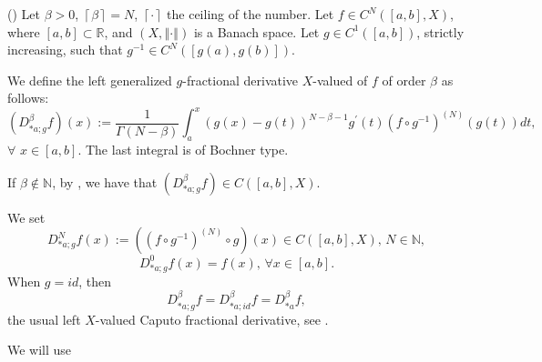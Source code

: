 \documentclass[10pt]{NSP1}
\numberwithin{equation}{section}
\begin{document}
\begin{definition}
\label{d4}(\cite{5}) Let $\beta >0$, $\left \lceil \beta \right \rceil =N$, $%
\left \lceil \cdot \right \rceil $ the ceiling of the number. Let $f\in
C^{N}\left( \left[ a,b\right] ,X\right) $, where $\left[ a,b\right] \subset
\mathbb{R}$, and $\left( X,\left \Vert \cdot \right \Vert \right) $ is a
Banach space. Let $g\in C^{1}\left( \left[ a,b\right] \right) $, strictly
increasing, such that $g^{-1}\in C^{N}\left( \left[ g\left( a\right)
,g\left( b\right) \right] \right) .$

We define the left generalized $g$-fractional derivative $X$-valued of $f$
of order $\beta $ as follows:
\begin{equation}
\left( D_{\ast a;g}^{\beta }f\right) \left( x\right) :=\frac{1}{\Gamma
\left( N-\beta \right) }\int_{a}^{x}\left( g\left( x\right) -g\left(
t\right) \right) ^{N-\beta -1}g^{\prime }\left( t\right) \left( f\circ
g^{-1}\right) ^{\left( N\right) }\left( g\left( t\right) \right) dt,
\tag{15}  \label{15}
\end{equation}
$\forall $ $x\in \left[ a,b\right] $. The last integral is of Bochner type.

If $\beta \notin \mathbb{N}$, by \cite{5}, we have that $\left( D_{\ast
a;g}^{\beta }f\right) \in C\left( \left[ a,b\right] ,X\right) .$
\end{definition}

We set
\begin{equation}
D_{\ast a;g}^{N}f\left( x\right) :=\left( \left( f\circ g^{-1}\right)
^{\left( N\right) }\circ g\right) \left( x\right) \in C\left( \left[ a,b%
\right] ,X\right) \text{, \ }N\in \mathbb{N},  \tag{16}  \label{16}
\end{equation}
\begin{equation*}
D_{\ast a;g}^{0}f\left( x\right) =f\left( x\right) \text{, \ }\forall \text{
}x\in \left[ a,b\right] .
\end{equation*}
When $g=id$, then
\begin{equation}
D_{\ast a;g}^{\beta }f=D_{\ast a;id}^{\beta }f=D_{\ast a}^{\beta }f,
\tag{17}  \label{17}
\end{equation}
the usual left $X$-valued Caputo fractional derivative, see \cite{9,11}.

We will use
\end{document}
